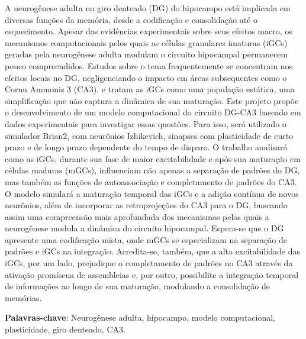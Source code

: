 \setlength{\absparsep}{18pt} %

\begin{resumo}

A neurogênese adulta no giro denteado (DG) do hipocampo está implicada em diversas funções da memória, desde a codificação e
consolidação até o esquecimento. Apesar das evidências experimentais sobre seus efeitos macro, os mecanismos computacionais pelos
quais as células granulares imaturas (iGCs) geradas pela neurogênese adulta modulam o circuito hipocampal permanecem pouco
compreendidos. Estudos sobre o tema frequentemente se concentram nos efeitos locais no DG, negligenciando o impacto em áreas
subsequentes como o Cornu Ammonis 3 (CA3), e tratam as iGCs como uma população estática, uma simplificação que não captura a
dinâmica de sua maturação. Este projeto propõe o desenvolvimento de um modelo computacional do circuito DG-CA3 baseado em dados
experimentais para investigar essas questões. Para isso, será utilizado o simulador Brian2, com neurônios Izhikevich, sinapses com
plasticidade de curto prazo e de longo prazo dependente do tempo de disparo. O trabalho analisará como as iGCs, durante sua fase
de maior excitabilidade e após sua maturação em células maduras (mGCs), influenciam não apenas a separação de padrões do DG, mas
também as funções de autoassociação e completamento de padrões do CA3. O modelo simulará a maturação temporal das iGCs e a adição
contínua de novos neurônios, além de incorporar as retroprojeções do CA3 para o DG, buscando assim uma compreensão mais
aprofundada dos mecanismos pelos quais a neurogênese modula a dinâmica do circuito hipocampal. Espera-se que o DG apresente uma
codificação mista, onde mGCs se especializam na separação de padrões e iGCs na integração. Acredita-se, também, que a alta
excitabilidade das iGCs, por um lado, prejudique o completamento de padrões no CA3 através da ativação promíscua de assembleias e,
por outro, possibilite a integração temporal de informações ao longo de sua maturação, modulando a consolidação de memórias.

\noindent\textbf{Palavras-chave}: Neurogênese adulta, hipocampo, modelo computacional, plasticidade, giro denteado, CA3.
\end{resumo}

